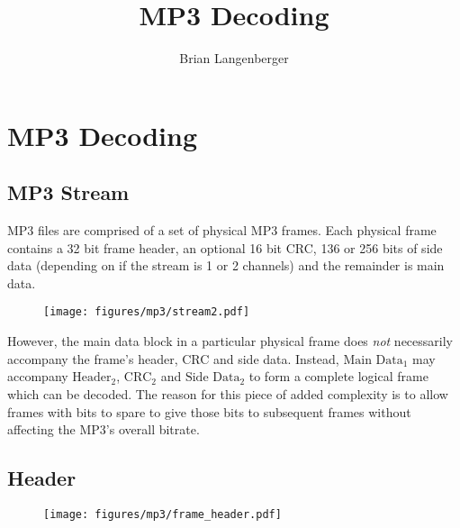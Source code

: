 \documentclass[letter]{scrbook}
\title{MP3 Decoding}
\author{Brian Langenberger}
\begin{document}
\maketitle
\tableofcontents
\chapter{MP3 Decoding}
\section{MP3 Stream}
MP3 files are comprised of a set of physical MP3 frames.
Each physical frame contains a 32 bit frame header,
an optional 16 bit CRC, 136 or 256 bits of side data
(depending on if the stream is 1 or 2 channels)
and the remainder is main data.

\begin{figure}[h]
\texttt{[image: figures/mp3/stream2.pdf]}
\end{figure}

However, the main data block in a particular physical frame
does \textit{not} necessarily accompany the frame's header,
CRC and side data.
Instead, $\text{Main Data}_1$ may accompany
$\text{Header}_2$, $\text{CRC}_2$ and $\text{Side Data}_2$
to form a complete logical frame which can be decoded.
The reason for this piece of added complexity is to allow
frames with bits to spare to give those bits to subsequent frames
without affecting the MP3's overall bitrate.

\clearpage

\section{Header}
\begin{figure}[h]
\texttt{[image: figures/mp3/frame\_header.pdf]}
\end{figure}
\end{document}
